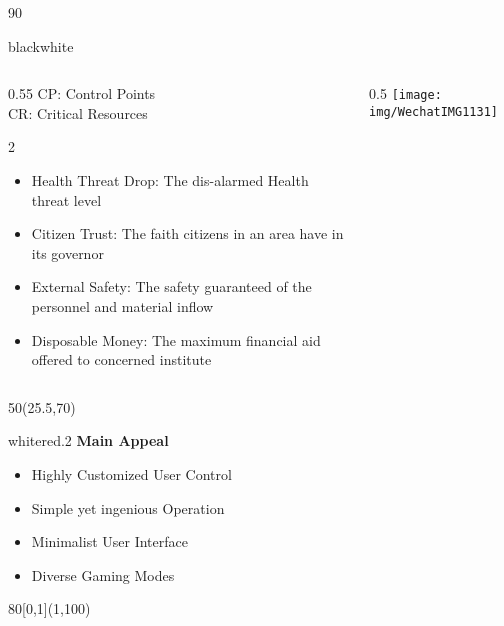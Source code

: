 \documentclass[hyperref={pdfpagelabels=false}]{beamer}
\begin{document}
\begin{frame}
\begin{textblock}{90}
\begin{baseroundedbox}[]{black}{white}
\begin{columns}
{\begin{column}{0.55\columnwidth}
					CP: Control Points\\
					CR: Critical Resources\\
					\begin{multicols}{2}
						\begin{itemize}
							\item Health Threat Drop: The dis-alarmed Health threat level
							\item Citizen Trust: The faith citizens in an area have in its governor
							\item External Safety: The safety guaranteed of the personnel and material inflow
							\item Disposable Money: The maximum financial aid offered to concerned institute
						\end{itemize}
					\end{multicols}
				\end{column}
				\begin{column}{0.5\columnwidth}
					\centering
					\texttt{[image: img/WechatIMG1131]}
				\end{column}}
			\end{columns}

		\end{baseroundedbox}
	\end{textblock}
	
	\begin{textblock}{50}(25.5,70)
		\begin{transparentbox}{white}{red}{.2}
				\centering \vspace{.25cm}
				\huge\textbf{Main Appeal}\vspace{1cm}

\begin{itemize}\itemsep .85cm
			\item Highly Customized User Control

				\item Simple yet ingenious Operation

				\item Minimalist User Interface

				\item  Diverse Gaming Modes
\end{itemize}       	 
		\end{transparentbox}
	\end{textblock} 

	\begin{textblock}{80}[0,1](1,100)
		\logos[light]
	\end{textblock}


\end{frame}
\end{document}
